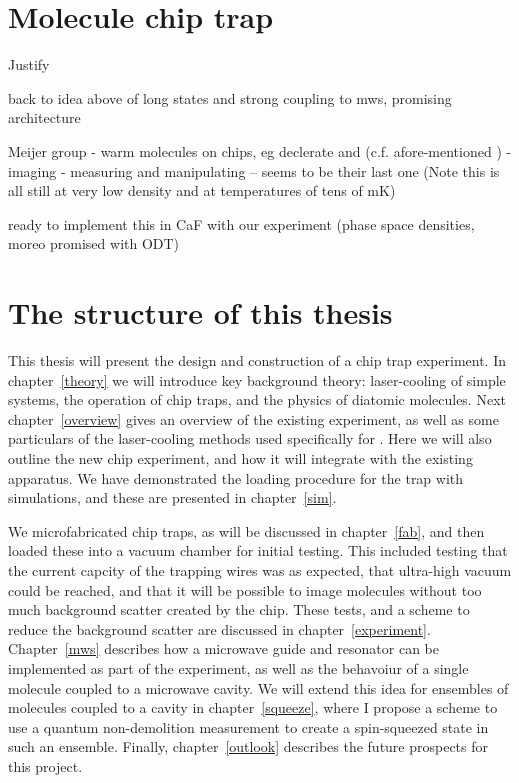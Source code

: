 \section{Molecule chip trap}

Justify

back to idea above of long states and strong coupling to mws, promising
architecture \cite{Andre2006}

Meijer group
- warm molecules on chips, eg declerate \cite{Meek2008} and \cite{Meek2009}
(c.f. afore-mentioned \cite{Bethlem1999})
- imaging \cite{Marx2013}
- measuring and manipulating \cite{PhysRevA.92.063408} -- seems to be their
last one
(Note this is all still at very low density and at temperatures of tens of mK)


ready to implement this in CaF with our experiment (phase space densities,
moreo promised with ODT)

\section{The structure of this thesis}

This thesis will present the design and construction of a \CaF{} chip trap
experiment. In chapter~\ref{theory} we will introduce key background theory: 
laser-cooling of simple systems, the operation of chip traps, and the physics
of diatomic molecules. Next chapter~\ref{overview} gives an overview of the
existing \CaF{} experiment, as well as some particulars of the laser-cooling
methods used specifically for \CaF{}. Here we will also outline the new chip
experiment, and how it will integrate with the existing apparatus. We have
demonstrated the loading procedure for the trap with simulations, and these are
presented in chapter~\ref{sim}.

We microfabricated chip traps, as will be discussed in chapter~\ref{fab}, and
then loaded these into a vacuum chamber for initial testing. This included
testing that the current capcity of the trapping wires was as expected, that
ultra-high vacuum could be reached, and that it will be possible to image
molecules without too much background scatter created by the chip. These tests,
and a scheme to reduce the background scatter are discussed in
chapter~\ref{experiment}. Chapter~\ref{mws} describes how a microwave guide and
resonator can be implemented as part of the experiment, as well as the
behavoiur of a single molecule coupled to a microwave cavity. We will extend
this idea for ensembles of molecules coupled to a cavity in
chapter~\ref{squeeze}, where I propose a scheme to use a quantum non-demolition
measurement to create a spin-squeezed state in such an ensemble. Finally,
chapter~\ref{outlook} describes the future prospects for this project.
